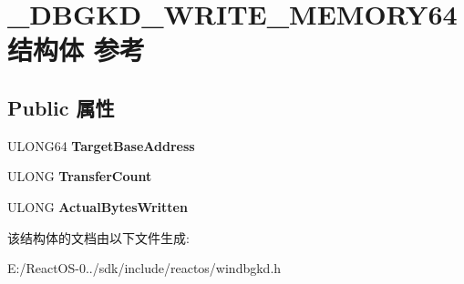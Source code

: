 \hypertarget{struct___d_b_g_k_d___w_r_i_t_e___m_e_m_o_r_y64}{}\section{\+\_\+\+D\+B\+G\+K\+D\+\_\+\+W\+R\+I\+T\+E\+\_\+\+M\+E\+M\+O\+R\+Y64结构体 参考}
\label{struct___d_b_g_k_d___w_r_i_t_e___m_e_m_o_r_y64}
\subsection*{Public 属性}
\begin{DoxyCompactItemize}
\item 
\mbox{\label{struct___d_b_g_k_d___w_r_i_t_e___m_e_m_o_r_y64_ab668918a5877415651b1585c6143f17e}} 
U\+L\+O\+N\+G64 {\bfseries Target\+Base\+Address}
\item 
\mbox{\label{struct___d_b_g_k_d___w_r_i_t_e___m_e_m_o_r_y64_af6642296b5457364002de6e466388440}} 
U\+L\+O\+NG {\bfseries Transfer\+Count}
\item 
\mbox{\label{struct___d_b_g_k_d___w_r_i_t_e___m_e_m_o_r_y64_a15ffbf62d559dc354f87252b5be8fb85}} 
U\+L\+O\+NG {\bfseries Actual\+Bytes\+Written}
\end{DoxyCompactItemize}


该结构体的文档由以下文件生成\+:\begin{DoxyCompactItemize}
\item 
E\+:/\+React\+O\+S-\/0../sdk/include/reactos/windbgkd.\+h\end{DoxyCompactItemize}
